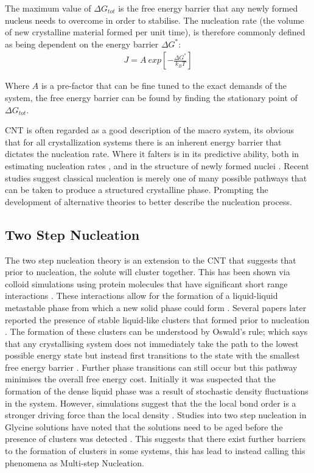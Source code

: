 The maximum value of $\Delta G_{tot}$ is the free energy barrier 
that any newly formed nucleus needs to overcome in order to stabilise. 
The nucleation rate (the volume of new crystalline material formed per 
unit time), is therefore commonly defined as being dependent on the 
energy barrier $\Delta G^*$:
\begin{align}
	J = A \ exp \left[-\frac{\Delta G^*}{k_BT} \right]
\end{align}

Where $A$ is a pre-factor that can be fine tuned to the exact 
demands of the system, the free energy barrier can be found by finding 
the stationary point of $\Delta G_{tot}$. 

CNT is often regarded as a good description of the macro system, its 
obvious that for all crystallization systems there is an inherent energy 
barrier that dictates the nucleation rate. Where it falters is in its 
predictive ability, both in estimating nucleation rates \cite{Gharibeh2005, 
Vekilov2010}, and in the structure of newly formed nuclei \cite{Lee1999, 
Yau2001}. Recent studies suggest classical nucleation is merely one of many 
possible pathways that can be taken to produce a structured crystalline phase. 
Prompting the development of alternative theories to better describe the 
nucleation process.

\subsection{Two Step Nucleation}
The two step nucleation theory is an extension to the CNT that suggests 
that prior to nucleation, the solute will cluster together. This has 
been shown via colloid simulations using protein molecules that have 
significant short range interactions \cite{Wolde1997, Gliko2005}. These 
interactions allow for the formation of a liquid-liquid metastable phase 
from which a new solid phase could form \cite{Anderson2002, Karthika2016}. 
Several papers later reported the presence of stable liquid-like clusters 
that formed prior to nucleation \cite{Savage2009, Wolde1997, Soga1999}. 
The formation of these clusters can be understood by Oswald's rule; which 
says that any crystallising system does not immediately take the path to 
the lowest possible energy state but instead first transitions to the state 
with the smallest free energy barrier \cite{Ostwald1897}. Further phase 
transitions can still occur but this pathway minimises the overall free 
energy cost. Initially it was suspected that the formation of the dense 
liquid phase was a result of stochastic density fluctuations in the system. 
However, simulations suggest that the the local bond order is a stronger 
driving force than the local density \cite{Tan2013}. Studies into two step 
nucleation in Glycine solutions have noted that the solutions need to be 
aged before the presence of clusters was detected \cite{Liao2022}. This 
suggests that there exist further barriers to the formation of clusters 
in some systems, this has lead to instead calling this phenomena as 
Multi-step Nucleation.

